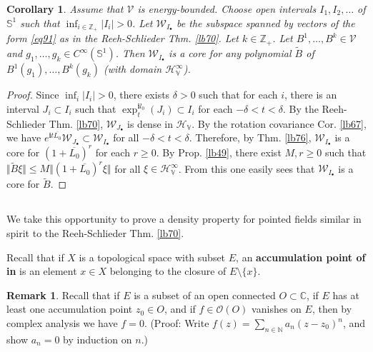 \documentclass[12pt,b5paper,notitlepage]{article}
\theoremstyle{definition}
\newtheorem{rem}[df]{Remark}
\theoremstyle{plain}
\newtheorem{co}[df]{Corollary}
\newcommand{\mc}{\mathcal}
\newcommand{\wtd}{\widetilde}
\newcommand{\ovl}{\overline}
\newcommand{\scr}{\mathscr}
\newcommand{\im}{\mathbf{i}}
\newcommand{\blt}{\bullet}
\newcommand{\Cbb}{\mathbb C}
\newcommand{\Nbb}{\mathbb N}
\newcommand{\Zbb}{\mathbb Z}
\newcommand{\Sbb}{{\mathbb S}}
\newcommand{\HV}{\mathcal H_{\mathbb V}}
\numberwithin{equation}{section}
\begin{document}
\begin{co}\label{lb88}
Assume that $\mc V$ is energy-bounded. Choose open intervals $I_1,I_2,\dots$ of $\Sbb^1$ such that $\inf_{i\in\Zbb_+}|I_i|>0$. Let $\mc W_{I_\blt}$ be the subspace spanned by vectors of the form \eqref{eq91} as in the Reeh-Schlieder Thm. \ref{lb70}. Let $k\in\Zbb_+$. Let $B^1,\dots,B^k\in\mc V$ and $g_1,\dots,g_k\in C^\infty(\Sbb^1)$. Then $\mc W_{I_\blt}$ is a core for any polynomial $\wtd B$ of $B^1(g_1),\dots,B^k(g_k)$ (with domain $\HV^\infty$).
\end{co}


\begin{proof}
Since $\inf_i|I_i|>0$, there exists $\delta>0$ such that for each $i$, there is an interval $J_i\subset I_i$ such that $\exp^{\im l_0}_t(J_i)\subset I_i$ for each $-\delta<t<\delta$. By the Reeh-Schlieder Thm. \ref{lb70}, $\mc W_{J_\blt}$ is dense in $\HV$. By the rotation covariance Cor. \ref{lb67}, we have $e^{\im t\ovl{L_0}}\mc W_{J_\blt}\subset\mc W_{I_\blt}$ for all $-\delta<t<\delta$. Therefore, by Thm. \ref{lb76}, $\mc W_{I_\blt}$ is a core for $(1+\ovl{L_0})^r$ for each $r\geq0$. By Prop. \ref{lb49}, there exist $M,r\geq0$ such that $\Vert \wtd B\xi\Vert\leq M\Vert (1+\ovl{L_0})^r\xi\Vert$ for all $\xi\in\HV^\infty$. From this one easily sees that  $\mc W_{I_\blt}$ is a core for $\wtd B$.
\end{proof}






\subsection{}




We take this opportunity to prove a density property for pointed fields similar in spirit to the Reeh-Schlieder Thm. \ref{lb70}.


Recall that if $X$ is a topological space with subset $E$, an \textbf{accumulation point of  in }  is an element $x\in X$ belonging to the closure of $E\setminus\{x\}$. 

\begin{rem}\label{lb71}
Recall that if $E$ is a subset of an open connected $O\subset\Cbb$, if $E$ has at least one accumulation point $z_0\in O$, and if $f\in\scr O(O)$ vanishes on $E$, then by complex analysis we have $f=0$. (Proof: Write $f(z)=\sum_{n\in\Nbb}a_n(z-z_0)^n$, and show $a_n=0$ by induction on $n$.)
\end{rem}
\end{document}
